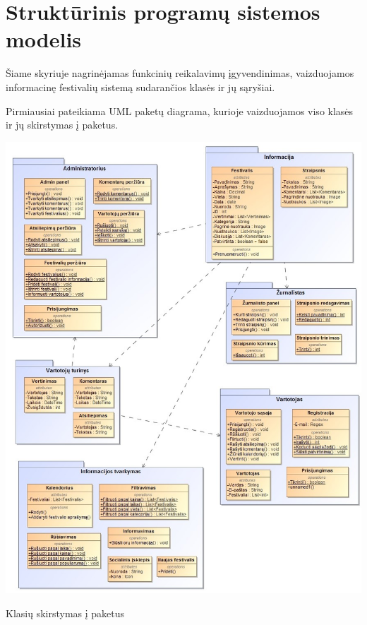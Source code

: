 ﻿\documentclass{VUMIFPSkursinis}
\begin{document}
\section{Struktūrinis programų sistemos modelis}
Šiame skyriuje nagrinėjamas funkcinių reikalavimų įgyvendinimas, vaizduojamos informacinę festivalių sistemą sudarančios klasės ir jų sąryšiai.

Pirmiausiai pateikiama UML paketų diagrama, kurioje vaizduojamos viso klasės ir jų skirstymas į paketus.
\begin{center}
    \includegraphics[scale=0.5]{img/PSI3/paketai}
	\label{img:uml17}
	\caption{Klasių skirstymas į paketus}
\end{center}
\end{document}

